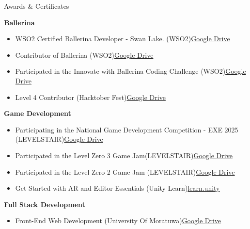 \documentclass{resume} %
\begin{document}
\begin{rSection}{Awards \& Certificates}
\item \textbf{Ballerina}
\begin{itemize}
    \itemsep -3pt {}
    \item WSO2 Certified Ballerina Developer - Swan Lake. (WSO2)\hfill \href{https://drive.google.com/file/d/1NMCyY4b_ExnblCQ6gIN4fLDlVEuvpu2_/view?usp=sharing}{Google Drive}
    \item Contributor of Ballerina (WSO2)\hfill \href{https://drive.google.com/file/d/1SgRCvWZDT8lnfLIgifV5ag5YYIJSSZ83/view?usp=drive_link}{Google Drive}
    \item Participated in the Innovate with Ballerina Coding Challenge (WSO2)\hfill \href{https://drive.google.com/file/d/1NSFzD-_UsUM-WQ4jqP0YVt12NVZKzX4J/view?usp=drive_link}{Google Drive}
    \item Level 4 Contributor (Hacktober Fest)\hfill \href{https://drive.google.com/file/d/1igEOCndLEjKHLd6FzaZIjAYJDQEqjV2J/view?usp=drive_link}{Google Drive}
\end{itemize}
\item \textbf{Game Development}
\begin{itemize}
    \itemsep -3pt {}
    \item Participating in the National Game Development Competition - EXE 2025 (LEVELSTAIR)\hfill \href{https://drive.google.com/file/d/1Z8m7bNJqP24FJAfpuU0tM-tQQUx9okW2/view?usp=drive_link}{Google Drive}
    \item Participated in the Level Zero 3 Game Jam(LEVELSTAIR)\hfill \href{https://drive.google.com/file/d/1ACsq_kPHJ1nCdPq4FLYcNu0p52xsFXde/view?usp=drive_link}{Google Drive}
    \item Participated in the Level Zero 2 Game Jam (LEVELSTAIR)\hfill \href{https://drive.google.com/file/d/1VdSnmT8Y1LtkyJ0gZ4VAVrP549ElTG4Y/view?usp=drive_link}{Google Drive}
    \item Get Started with AR and Editor Essentials (Unity Learn)\hfill \href{https://learn.unity.com/u/621279f6edbc2a7b6b9fbc9a}{learn.unity}
\end{itemize}
\item \textbf{ Full Stack Development}
\begin{itemize}
    \itemsep -3pt {}
    \item Front-End Web Development (University Of Moratuwa)\hfill \href{https://drive.google.com/file/d/1kLSSzzKu4FM7Qh-Jimj9iXqyyGClFURe/view?usp=drive_link}{Google Drive}

\end{itemize}
\end{rSection}
\end{document}
